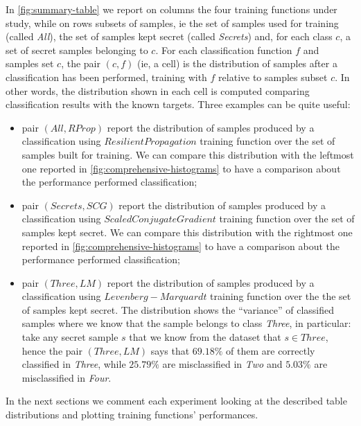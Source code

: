 \documentclass[10pt,a4paper]{article}
\begin{document}
    In \autoref{fig:summary-table} we report on columns the four training functions under study,
    while on rows subsets of samples, ie the set of samples used for training (called \emph{All}), 
    the set of samples kept secret (called \emph{Secrets}) and, for each class $c$, a set of secret samples belonging to $c$.
    For each classification function $f$ and samples set $c$, the pair $(c, f)$ (ie, a cell) 
    is the distribution of samples after a classification has been performed, training with $f$
    relative to samples subset $c$. In other words, the distribution shown in each cell is
    computed comparing classification results with the known targets. Three examples 
    can be quite useful:
    \begin{itemize}
        \item pair $(All, RProp)$ report the distribution of samples produced by a classification
        using $Resilient Propagation$ training function over the set of samples built for training.
        We can compare this distribution with the leftmost one reported in \autoref{fig:comprehensive-histograms}
        to have a comparison about the performance performed classification;

        \item pair $(Secrets, SCG)$ report the distribution of samples produced by a classification
        using $Scaled Conjugate Gradient$ training function over the set of samples kept secret.
        We can compare this distribution with the rightmost one reported in \autoref{fig:comprehensive-histograms}
        to have a comparison about the performance performed classification;

        \item pair $(Three, LM)$ report the distribution of samples produced by a classification
        using $Levenberg-Marquardt$ training function over the the set of samples kept secret.
        The distribution shows the ``variance'' of classified samples where we know that the
        sample belongs to class \emph{Three}, in particular: take any secret sample $s$ that we know from the 
        dataset that $s \in Three$, hence the pair $(Three, LM)$ says that $69.18 \%$ of them
        are correctly classified in \emph{Three}, while $25.79 \%$ are misclassified in \emph{Two} and 
        $5.03 \%$ are misclassified in \emph{Four}.

    \end{itemize}
    
    In the next sections we comment each experiment looking at the described table distributions
    and plotting training functions' performances.
\end{document}
